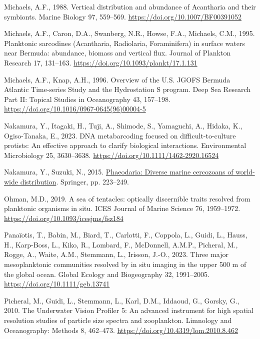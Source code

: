 \documentclass[
]{article}
\newlength{\cslhangindent}
\newlength{\cslentryspacingunit} %
\newenvironment{CSLReferences}[2] %
 {%
  \setlength{\parindent}{0pt}
  \ifodd #1
  \let\oldpar\par
  \def\par{\hangindent=\cslhangindent\oldpar}
  \fi
  \setlength{\parskip}{#2\cslentryspacingunit}
 }%
 {}
\begin{document}
\begin{CSLReferences}{1}{0}
\leavevmode{}%
Michaels, A.F., 1988. Vertical distribution and abundance of Acantharia
and their symbionts. Marine Biology 97, 559--569.
\url{https://doi.org/10.1007/BF00391052}

\leavevmode{}%
Michaels, A.F., Caron, D.A., Swanberg, N.R., Howse, F.A., Michaels,
C.M., 1995. Planktonic sarcodines (Acantharia, Radiolaria, Foraminifera)
in surface waters near Bermuda: abundance, biomass and vertical flux.
Journal of Plankton Research 17, 131--163.
\url{https://doi.org/10.1093/plankt/17.1.131}

\leavevmode{}%
Michaels, A.F., Knap, A.H., 1996. Overview of the U.S. JGOFS Bermuda
Atlantic Time-series Study and the Hydrostation S program. Deep Sea
Research Part II: Topical Studies in Oceanography 43, 157--198.
\url{https://doi.org/10.1016/0967-0645(96)00004-5}

\leavevmode{}%
Nakamura, Y., Itagaki, H., Tuji, A., Shimode, S., Yamaguchi, A., Hidaka,
K., Ogiso-Tanaka, E., 2023. DNA metabarcoding focused on
difficult-to-culture protists: An effective approach to clarify
biological interactions. Environmental Microbiology 25, 3630--3638.
\url{https://doi.org/10.1111/1462-2920.16524}

\leavevmode{}%
Nakamura, Y., Suzuki, N., 2015.
\href{https://link.springer.com/chapter/10.1007/978-4-431-55130-0_9}{Phaeodaria:
Diverse marine cercozoans of world-wide distribution}. Springer, pp.
223--249.

\leavevmode{}%
Ohman, M.D., 2019. A sea of tentacles: optically discernible traits
resolved from planktonic organisms in situ. ICES Journal of Marine
Science 76, 1959--1972. \url{https://doi.org/10.1093/icesjms/fsz184}

\leavevmode{}%
Panaïotis, T., Babin, M., Biard, T., Carlotti, F., Coppola, L., Guidi,
L., Hauss, H., Karp-Boss, L., Kiko, R., Lombard, F., McDonnell, A.M.P.,
Picheral, M., Rogge, A., Waite, A.M., Stemmann, L., Irisson, J.-O.,
2023. Three major mesoplanktonic communities resolved by in situ imaging
in the upper 500 m of the global ocean. Global Ecology and Biogeography
32, 1991--2005. \url{https://doi.org/10.1111/geb.13741}

\leavevmode{}%
Picheral, M., Guidi, L., Stemmann, L., Karl, D.M., Iddaoud, G., Gorsky,
G., 2010. The Underwater Vision Profiler 5: An advanced instrument for
high spatial resolution studies of particle size spectra and
zooplankton. Limnology and Oceanography: Methods 8, 462--473.
\url{https://doi.org/10.4319/lom.2010.8.462}


\end{CSLReferences}
\end{document}
